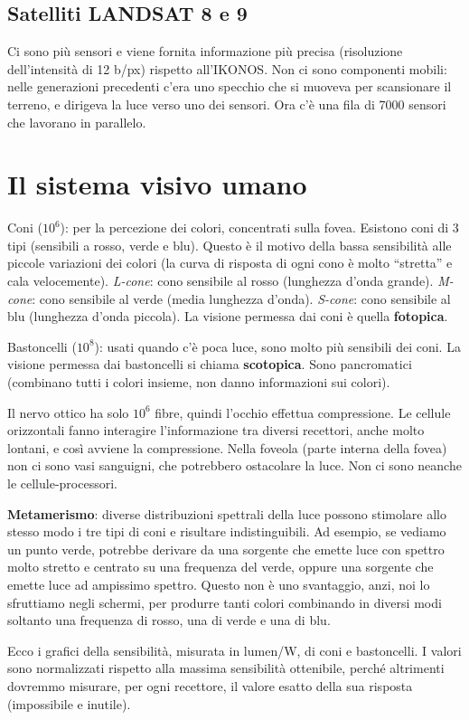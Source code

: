 \documentclass[a4paper,11pt]{article}
\begin{document}
\subsection{Satelliti LANDSAT 8 e 9}
Ci sono più sensori e viene fornita informazione più precisa (risoluzione dell'intensità di 12 b/px) rispetto all'IKONOS.
Non ci sono componenti mobili: nelle generazioni precedenti c'era uno specchio che si muoveva per scansionare
il terreno, e dirigeva la luce verso uno dei sensori. Ora c'è una fila di 7000 sensori che lavorano in parallelo.

\newpage

\section{Il sistema visivo umano}
Coni ($10^6$): per la percezione dei colori, concentrati sulla fovea. Esistono coni di 3 tipi (sensibili a rosso, verde e blu).
Questo è il motivo della bassa sensibilità alle piccole variazioni dei colori (la curva di risposta di ogni cono è molto ``stretta'' e cala velocemente).
\textit{L-cone}: cono sensibile al rosso (lunghezza d'onda grande). \textit{M-cone}: cono sensibile al verde (media lunghezza d'onda). \textit{S-cone}: cono sensibile al blu (lunghezza d'onda piccola).
La visione permessa dai coni è quella \textbf{fotopica}.
\par
Bastoncelli ($10^8$): usati quando c'è poca luce, sono molto più sensibili dei coni. La visione permessa dai bastoncelli si chiama \textbf{scotopica}.
Sono pancromatici (combinano tutti i colori insieme, non danno informazioni sui colori).
\par
Il nervo ottico ha solo $10^6$ fibre, quindi l'occhio effettua compressione.
Le cellule orizzontali fanno interagire l'informazione tra diversi recettori, anche molto lontani, e così avviene la compressione.
Nella foveola (parte interna della fovea) non ci sono vasi sanguigni, che potrebbero ostacolare la luce. Non ci sono neanche le
cellule-processori.
\par
\textbf{Metamerismo}: diverse distribuzioni spettrali della luce possono stimolare allo stesso modo i tre tipi
di coni e risultare indistinguibili. Ad esempio, se vediamo un punto verde, potrebbe derivare da una sorgente che emette luce con spettro
molto stretto e centrato su una frequenza del verde, oppure una sorgente che emette luce ad ampissimo spettro.
Questo non è uno svantaggio, anzi, noi lo sfruttiamo negli schermi, per produrre tanti colori combinando in diversi modi soltanto una frequenza di rosso, una di verde e una di blu.
\par
Ecco i grafici della sensibilità, misurata in lumen/W, di coni e bastoncelli. I valori sono normalizzati rispetto alla massima sensibilità ottenibile,
perché altrimenti dovremmo misurare, per ogni recettore, il valore esatto della sua risposta (impossibile e inutile).
\end{document}
